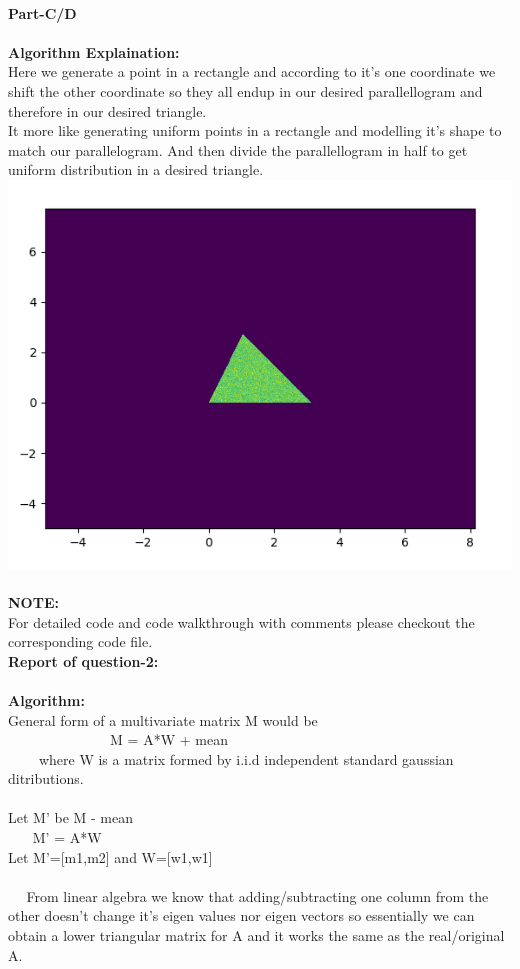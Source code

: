 \documentclass{article}
\begin{document}
    \\
    \textbf{Part-C/D}\\
    \\
    \textbf{Algorithm Explaination:}\\
        Here we generate a point in a rectangle and according to it's one coordinate
        we shift the other coordinate so they all endup in our desired parallellogram and
        therefore in our desired triangle.\\
        It more like generating uniform points in a rectangle and modelling it's shape
        to match our parallelogram. And then divide the parallellogram in half to get uniform
        distribution in a desired triangle.\\
        \includegraphics[scale=.6]{../results/q1/q1partC.png}\\
    \\
    \textbf{NOTE:}\\
    For detailed code and code walkthrough with comments please checkout the corresponding code file.\\

$$ $$
\textbf{Report of question-2:}\\
    \\
    \textbf{Algorithm:}\\
    General form of a multivariate matrix M would be\\
    $~~~~~~~~~~~~~~~~~~~~~~~~~~~~~~~~~$M = A*W + mean\\
    $~~~~~~~~~~$where W is a matrix formed by i.i.d independent standard gaussian ditributions.\\
    \\
    Let M' be M - mean\\
    $~~~~~~~~$M' = A*W
    \\
    Let M'=[m1,m2] and W=[w1,w1]\\
    \\
    $~~~~~~$From linear algebra we know that adding/subtracting one column from the other doesn't change
    it's eigen values nor eigen vectors so essentially we can obtain a lower triangular matrix for A
    and it works the same as the real/original A.\\
\end{document}
